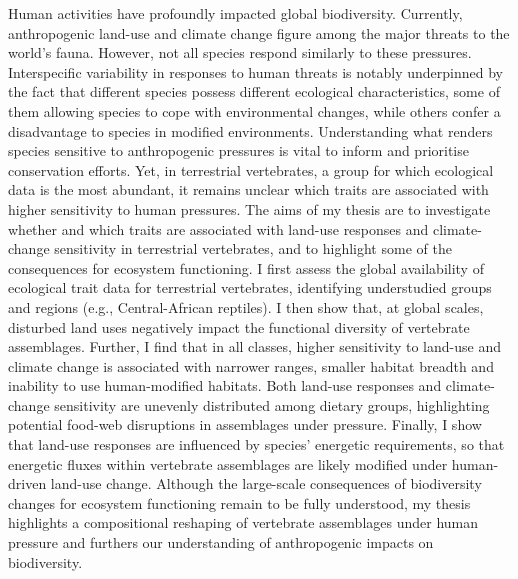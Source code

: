 
Human activities have profoundly impacted global biodiversity. Currently, anthropogenic land-use and climate change figure among the major threats to the world’s fauna. However, not all species respond similarly to these pressures. Interspecific variability in responses to human threats is notably underpinned by the fact that different species possess different ecological characteristics, some of them allowing species to cope with environmental changes, while others confer a disadvantage to species in modified environments. Understanding what renders species sensitive to anthropogenic pressures is vital to inform and prioritise conservation efforts. Yet, in terrestrial vertebrates, a group for which ecological data is the most abundant, it remains unclear which traits are associated with higher sensitivity to human pressures. The aims of my thesis are to investigate whether and which traits are associated with  land-use responses and climate-change sensitivity in terrestrial vertebrates, and to highlight some of the consequences for ecosystem functioning. I first assess the global availability of ecological trait data for terrestrial vertebrates, identifying understudied groups and regions (e.g., Central-African reptiles). I then show that, at global scales, disturbed land uses negatively impact the functional diversity of vertebrate assemblages.  Further, I find that in all classes, higher sensitivity to land-use and climate change is associated with  narrower ranges, smaller habitat breadth and inability to use human-modified habitats. Both land-use responses and climate-change sensitivity are unevenly distributed among dietary groups, highlighting potential food-web disruptions in assemblages under pressure.  Finally, I show that land-use responses are influenced by species' energetic requirements, so that energetic fluxes within vertebrate assemblages are likely modified under human-driven land-use change. Although the large-scale consequences of biodiversity changes for ecosystem functioning remain to be fully understood, my thesis highlights a compositional reshaping of vertebrate assemblages under human pressure and furthers our understanding of anthropogenic impacts on biodiversity.  